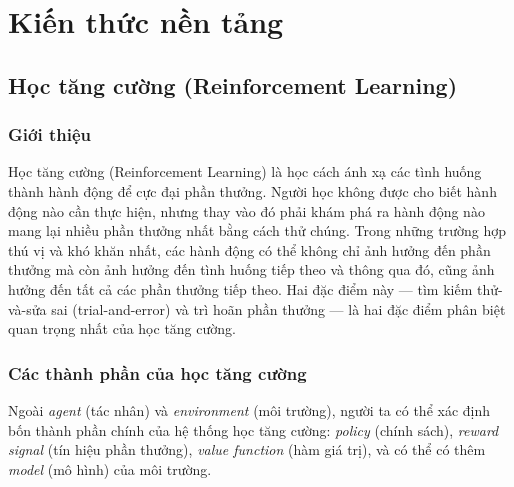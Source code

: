 \chapter{Kiến thức nền tảng}

\section{Học tăng cường (Reinforcement Learning)}

\subsection{Giới thiệu}
Học tăng cường (Reinforcement Learning)
\cite{reinforcementlearninganintroduction} là học cách ánh xạ các
tình huống thành hành động để cực đại phần thưởng. Người học
không được cho biết hành động nào cần thực hiện, nhưng thay vào đó
phải khám phá ra hành động nào mang lại nhiều phần thưởng nhất
bằng cách thử chúng. Trong những trường hợp thú vị và khó khăn nhất,
các hành động có thể không chỉ ảnh hưởng đến phần thưởng mà còn
ảnh hưởng đến tình huống tiếp theo và thông qua đó, cũng ảnh hưởng
đến tất cả các phần thưởng tiếp theo. Hai đặc điểm này —
tìm kiếm thử-và-sửa sai (trial-and-error) và trì hoãn phần thưởng —
là hai đặc điểm phân biệt quan trọng nhất của học tăng cường.

\subsection{Các thành phần của học tăng cường}
Ngoài \textit{agent} (tác nhân) và \textit{environment} (môi trường),
người ta có thể xác định bốn thành phần chính của hệ thống
học tăng cường: \textit{policy} (chính sách), \textit{reward signal}
(tín hiệu phần thưởng), \textit{value function} (hàm giá trị),
và có thể có thêm \textit{model} (mô hình) của môi trường.

